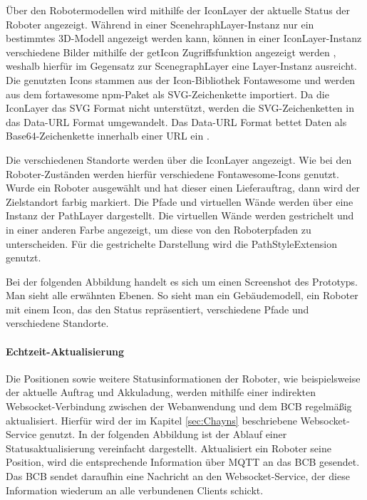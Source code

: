 Über den Robotermodellen wird mithilfe der IconLayer der aktuelle Status der Roboter angezeigt. Während in einer ScenehraphLayer-Instanz nur ein bestimmtes 3D-Modell angezeigt werden kann, können in einer IconLayer-Instanz verschiedene Bilder mithilfe der getIcon Zugriffsfunktion angezeigt werden \cite{DeckglIconLayer}, weshalb hierfür im Gegensatz zur ScenegraphLayer eine Layer-Instanz ausreicht. Die genutzten Icons stammen aus der Icon-Bibliothek Fontawesome und werden aus dem fortawesome \ac{npm}-Paket als \ac{SVG}-Zeichenkette importiert. Da die IconLayer das \ac{SVG} Format nicht unterstützt, werden die \ac{SVG}-Zeichenketten in das Data-\ac{URL} Format umgewandelt. Das Data-\ac{URL} Format bettet Daten als \gls{Base64}-Zeichenkette innerhalb einer \ac{URL} ein \cite{DataUrl}.

Die verschiedenen Standorte werden über die IconLayer angezeigt. Wie bei den Roboter-Zuständen werden hierfür verschiedene Fontawesome-Icons genutzt. Wurde ein Roboter ausgewählt und hat dieser einen Lieferauftrag, dann wird der Zielstandort farbig markiert. Die Pfade und virtuellen Wände werden über eine Instanz der PathLayer \cite{DeckglPathLayer} dargestellt. Die virtuellen Wände werden gestrichelt und in einer anderen Farbe angezeigt, um diese von den Roboterpfaden zu unterscheiden. Für die gestrichelte Darstellung wird die PathStyleExtension \cite{DeckglPathStyleExtension} genutzt.

Bei der folgenden Abbildung handelt es sich um einen Screenshot des Prototyps. Man sieht alle erwähnten Ebenen. So sieht man ein Gebäudemodell, ein Roboter mit einem Icon, das den Status repräsentiert, verschiedene Pfade und verschiedene Standorte.

\paragraph{Echtzeit-Aktualisierung}
Die Positionen sowie weitere Statusinformationen der Roboter, wie beispielsweise der aktuelle Auftrag und Akkuladung, werden mithilfe einer indirekten \gls{Websocket}-Verbindung zwischen der Webanwendung und dem \ac{BCB} regelmäßig aktualisiert. Hierfür wird der im Kapitel \ref{sec:Chayns} beschriebene \gls{Websocket}-Service genutzt. In der folgenden Abbildung ist der Ablauf einer Statusaktualisierung vereinfacht dargestellt. Aktualisiert ein Roboter seine Position, wird die entsprechende Information über \gls{MQTT} an das \ac{BCB} gesendet.
Das \ac{BCB} sendet daraufhin eine Nachricht an den \gls{Websocket}-Service, der diese Information wiederum an alle verbundenen Clients schickt.

